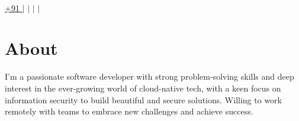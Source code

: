 \documentclass[letterpaper,12pt]{article}
\begin{document}
\begin{center}
  \textbf{\Huge \scshape \myName} \\ \vspace{5pt}
  \small
  {\expandafter\href\expandafter{tel:+91\myPhoneNumber}{\underline{+91 \myPhoneNumber}}} $|$
  {\expandafter\href\expandafter{mailto:\myEmail}{\underline{\myEmail}}} $|$
  {\expandafter\href\expandafter{https://\myWebsite}{\underline{\myWebsite}}} $|$
  {\expandafter\href\expandafter{https://\myGithub}{\underline{\myGithub}}} $|$
  {\expandafter\href\expandafter{https://www.timeanddate.com/time/zone/india/\myCityTzSlug}{\underline{\myLocation}}}
\end{center}


\section{About}
\begin{adjustwidth}{8pt}{4pt}
  \hspace{35pt}
  \small{I'm a passionate software developer with strong problem-solving skills and deep interest in the ever-growing world of cloud-native tech, with a keen focus on information security to build beautiful and secure solutions. Willing to work remotely with teams to embrace new challenges and achieve success.}
\end{adjustwidth}

\end{document}
